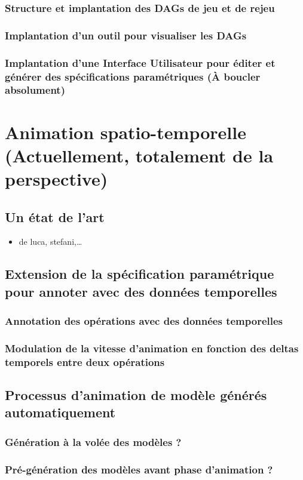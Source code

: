 \documentclass[11pt]{article}
\begin{document}
\subsubsection{Structure et implantation des DAGs de jeu et de rejeu}
\label{sec:orgf314be9}
\subsubsection{Implantation d'un outil pour visualiser les DAGs}
\label{sec:orgb519670}
\subsubsection{Implantation d'une Interface Utilisateur pour éditer et générer des spécifications paramétriques (À boucler absolument)}
\label{sec:org33eb70c}
\section{Animation spatio-temporelle (Actuellement, totalement de la perspective)}
\label{sec:orgcb98af8}
\subsection{Un état de l'art}
\label{sec:org5648a0d}
\begin{itemize}
\item de luca, stefani,…
\end{itemize}
\subsection{Extension de la spécification paramétrique pour annoter avec des données temporelles}
\label{sec:org88ad9d0}
\subsubsection{Annotation des opérations avec des données temporelles}
\label{sec:org3134710}
\subsubsection{Modulation de la vitesse d'animation en fonction des deltas temporels entre deux opérations}
\label{sec:org83180aa}
\subsection{Processus d'animation de modèle générés automatiquement}
\label{sec:org6e3ee11}
\subsubsection{Génération à la volée des modèles ?}
\label{sec:org5d8e99e}
\subsubsection{Pré-génération des modèles avant phase d'animation ?}
\label{sec:org5def7fa}
\end{document}
